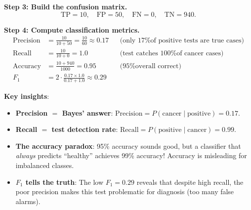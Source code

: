 \begin{example}
    \textbf{Step 3: Build the confusion matrix.}
    \[
        \text{TP} = 10, \quad \text{FP} = 50, \quad \text{FN} = 0, \quad \text{TN} = 940.
    \]

    \textbf{Step 4: Compute classification metrics.}
    \begin{align*}
        \text{Precision} & = \frac{10}{10+50} = \frac{10}{60} \approx 0.17           &  & \text{(only 17\% of positive tests are true cases)} \\
        \text{Recall}    & = \frac{10}{10+0} = 1.0                                   &  & \text{(test catches 100\% of cancer cases)}         \\
        \text{Accuracy}  & = \frac{10+940}{1000} = 0.95                              &  & \text{(95\% overall correct)}                       \\
        F_1              & = 2 \cdot \frac{0.17 \times 1.0}{0.17 + 1.0} \approx 0.29
    \end{align*}

    \textbf{Key insights}:
    \begin{itemize}
        \item \textbf{Precision $=$ Bayes' answer}: $\text{Precision} = P(\text{cancer} \mid \text{positive}) = 0.17$.
        \item \textbf{Recall $=$ test detection rate}: $\text{Recall} = P(\text{positive} \mid \text{cancer}) = 0.99$.
        \item \textbf{The accuracy paradox}: 95\% accuracy sounds good, but a classifier that \emph{always} predicts ``healthy'' achieves 99\% accuracy! Accuracy is misleading for imbalanced classes.
        \item \textbf{$F_1$ tells the truth}: The low $F_1 = 0.29$ reveals that despite high recall, the poor precision makes this test problematic for diagnosis (too many false alarms).
    \end{itemize}
\end{example}

